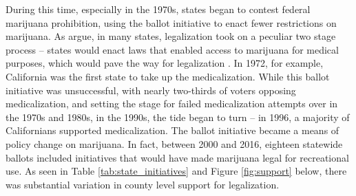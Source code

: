 During this time, especially in the 1970s, states began to contest federal marijuana prohibition, using the ballot initiative to enact fewer restrictions on marijuana. As \citet{newhart_and_dolphin_2018} argue, in many states, legalization took on a peculiar two stage process -- states would enact laws that enabled access to marijuana for medical purposes, which would pave the way for legalization \citep{newhart_and_dolphin_2018,kilmer_and_maccoun_2017}. In 1972, for example, California was the first state to take up the medicalization. While this ballot initiative was unsuccessful, with nearly two-thirds of voters opposing medicalization, and setting the stage for failed medicalization attempts over in the 1970s and 1980s, in the 1990s, the tide began to turn -- in 1996, a majority of Californians supported medicalization. The ballot initiative became a means of policy change on marijuana. In fact, between 2000 and 2016, eighteen statewide ballots included initiatives that would have made marijuana legal for recreational use. As seen in Table \ref{tab:state_initiatives} and Figure \ref{fig:support} below, there was substantial variation in county level support for legalization. 



 



{\renewcommand\normalsize{\footnotesize}%

%


}




%


